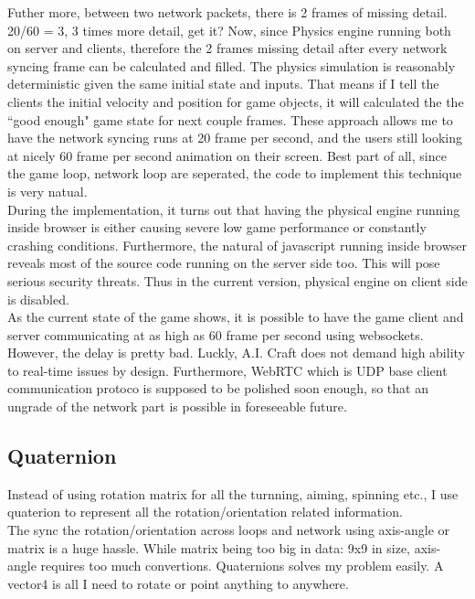 \documentclass[12pt]{article}
\begin{document}
Futher more, between two network packets, there is 2 frames of missing detail. 20/60 = 3, 3 times more detail, get it? Now, since Physics engine running both on server and clients, therefore the 2 frames missing detail after every network syncing frame can be calculated and filled. The physics simulation is reasonably deterministic given the same initial state and inputs. That means if I tell the clients the initial velocity and position for game objects, it will calculated the the ``good enough" game state for next couple frames. These approach allows me to have the network syncing runs at 20 frame per second, and the users still looking at nicely 60 frame per second animation on their screen. Best part of all, since the game loop, network loop are seperated, the code to implement this technique is very natual.\\

{\color{red}
During the implementation, it turns out that having the physical engine running inside browser is either causing severe low game performance or constantly crashing conditions. Furthermore, the natural of javascript running inside browser reveals most of the source code running on the server side too. This will pose serious security threats. Thus in the current version, physical engine on client side is disabled.\\

As the current state of the game shows, it is possible to have the game client and server communicating at as high as 60 frame per second using websockets. However, the delay is pretty bad. Luckly, A.I. Craft does not demand high ability to real-time issues by design. Furthermore, WebRTC which is UDP base client communication protoco is supposed to be polished soon enough, so that an ungrade of the network part is possible in foreseeable future.\\
}

\subsection{Quaternion}
Instead of using rotation matrix for all the turnning, aiming, spinning etc., I use quaterion to represent all the rotation/orientation related information.\\

The sync the rotation/orientation across loops and network using axis-angle or matrix is a huge hassle. While matrix being too big in data: 9x9 in size, axis-angle requires too much convertions. Quaternions solves my problem easily. A vector4 is all I need to rotate or point anything to anywhere.\\
\end{document}
